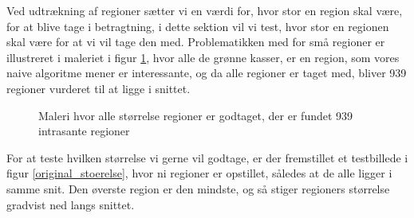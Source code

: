 {
Ved udtrækning af regioner sætter vi en værdi for, hvor stor en region skal
være, for at blive tage i betragtning, i dette sektion vil vi test, hvor stor
en regionen skal være for at vi vil tage den med. Problematikken med for små
regioner er illustreret i maleriet i figur \ref{alt_med}, hvor alle de grønne
kasser, er en region, som vores naive algoritme mener er interessante, og da
alle regioner er taget med, bliver 939 regioner vurderet til at ligge i
snittet.

\begin{figure}[¡h]
    \setlength\fboxsep{0pt}
    \setlength\fboxrule{0.5pt}
    \begin{center}
    \end{center}
    \caption{Maleri hvor alle størrelse regioner er godtaget, der er fundet 939 intrasante regioner}
	\label{alt_med}
\end{figure}

For at teste hvilken størrelse vi gerne vil godtage, er der fremstillet et
testbillede i figur \ref{original_stoerelse}, hvor ni regioner er opstillet,
således at de alle ligger i samme snit. Den øverste region er den mindste, og
så stiger regioners størrelse gradvist ned langs snittet.

}
